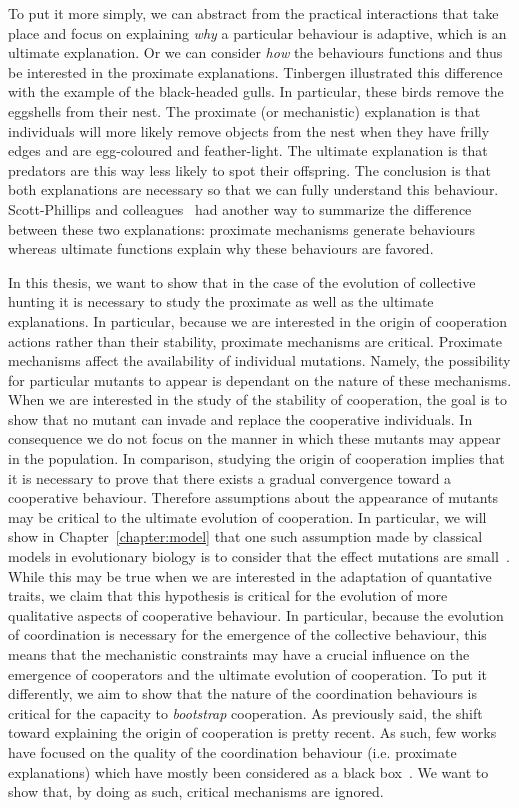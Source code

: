     To put it more simply, we can abstract from the practical interactions that take place and focus on explaining \emph{why} a particular behaviour is adaptive, which is an ultimate explanation. Or we can consider \emph{how} the behaviours functions and thus be interested in the proximate explanations. Tinbergen illustrated this difference with the example of the black-headed gulls. In particular, these birds remove the eggshells from their nest. The proximate (or mechanistic) explanation is that individuals will more likely remove objects from the nest when they have frilly edges and are egg-coloured and feather-light. The ultimate explanation is that predators are this way less likely to spot their offspring. The conclusion is that both explanations are necessary so that we can fully understand this behaviour. Scott-Phillips and colleagues~\parencite{Scott-Phillips2011} had another way to summarize the difference between these two explanations: proximate mechanisms generate behaviours whereas ultimate functions explain why these behaviours are favored.

    In this thesis, we want to show that in the case of the evolution of collective hunting it is necessary to study the proximate as well as the ultimate explanations. In particular, because we are interested in the origin of cooperation actions rather than their stability, proximate mechanisms are critical. Proximate mechanisms affect the availability of individual mutations. Namely, the possibility for particular mutants to appear is dependant on the nature of these mechanisms. When we are interested in the study of the stability of cooperation, the goal is to show that no mutant can invade and replace the cooperative individuals. In consequence we do not focus on the manner in which these mutants may appear in the population. In comparison, studying the origin of cooperation implies that it is necessary to prove that there exists a gradual convergence toward a cooperative behaviour. Therefore assumptions about the appearance of mutants may be critical to the ultimate evolution of cooperation. In particular, we will show in Chapter~\ref{chapter:model} that one such assumption made by classical models in evolutionary biology is to consider that the effect mutations are small~\parencite{Geritz1998, McGill2007}. While this may be true when we are interested in the adaptation of quantative traits, we claim that this hypothesis is critical for the evolution of more qualitative aspects of cooperative behaviour. In particular, because the evolution of coordination is necessary for the emergence of the collective behaviour, this means that the mechanistic constraints may have a crucial influence on the emergence of cooperators and the ultimate evolution of cooperation. To put it differently, we aim to show that the nature of the coordination behaviours is critical for the capacity to \emph{bootstrap} cooperation. As previously said, the shift toward explaining the origin of cooperation is pretty recent. As such, few works have focused on the quality of the coordination behaviour (i.e. proximate explanations) which have mostly been considered as a black box~\parencite{Calcott2007a}. We want to show that, by doing as such, critical mechanisms are ignored.

